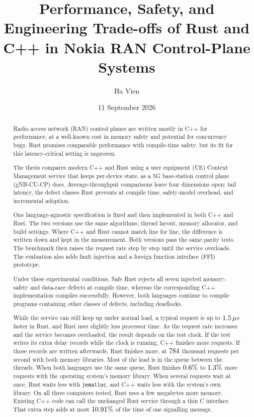 \documentclass[english,oneside,a4paper,censored,csm,software-track-2020]{HYthesisML}
\title{Performance, Safety, and Engineering Trade-offs of Rust and C++ in Nokia RAN Control-Plane Systems}
\author{Ha Vien}
\date{11 September 2026}
\begin{document}
\maketitle

{\singlespacing
\begin{otherlanguage}{english}
\begin{abstract}
      \setlength{\parskip}{1ex}
      Radio access network (RAN) control planes are written mostly in C++ for performance, at a
      well-known cost in memory safety and potential for concurrency bugs. Rust promises comparable performance with
      compile-time safety, but its fit for this latency-critical setting is unproven.
      
      The thesis compares modern C++ and Rust using a user equipment (UE) Context Management
      service that keeps per-device state, as a 5G base-station control plane (gNB-CU-CP) does.
      Average-throughput comparisons leave four dimensions open: tail latency, the defect classes
      Rust prevents at compile time, safety-model overhead, and incremental adoption.
      
      One language-agnostic specification is fixed and then implemented in both C++ and Rust.
      The two versions use the same algorithms, thread layout, memory allocator, and build settings.
      Where C++ and Rust cannot match line for line, the difference is written down and kept in
      the measurement. Both versions pass the same parity tests. The benchmark then raises the request
      rate step by step until the service overloads. The evaluation also adds fault injection and
      a foreign function interface (FFI) prototype.
      
      Under these experimental conditions, Safe Rust rejects all seven injected memory-safety 
      and data-race defects at compile time, whereas the corresponding C++ implementation 
      compiles successfully. However, both languages continue to compile programs containing 
      other classes of defects, including deadlocks.

      While the service can still keep up under normal load, a typical request is up to
      $1.5\,\mu$s faster in Rust, and Rust uses slightly less
      processor time. As the request rate increases and the service becomes overloaded, 
      the result depends on the test clock. If the test writes its extra delay records while the clock
      is running, C++ finishes more requests. If those records are written
      afterwards, Rust finishes more, at $784$ thousand
      requests per second with both memory libraries. Most of the lead is in
      the queue between the threads. When both languages use the same queue, Rust
      finishes $0.6\%$ to $1.3\%$ more requests with
      the operating system's memory library. When several requests wait at once,
      Rust waits less with \texttt{jemalloc}, and C++ waits less with the system's
      own library. On all three computers tested, Rust uses a few megabytes more
      memory. Existing C++ code can call the unchanged Rust service through a thin
      C interface. That extra step adds at most $10.91\%$ of the time of
      one signalling message.
      

\end{abstract}
\end{otherlanguage}}
\end{document}
